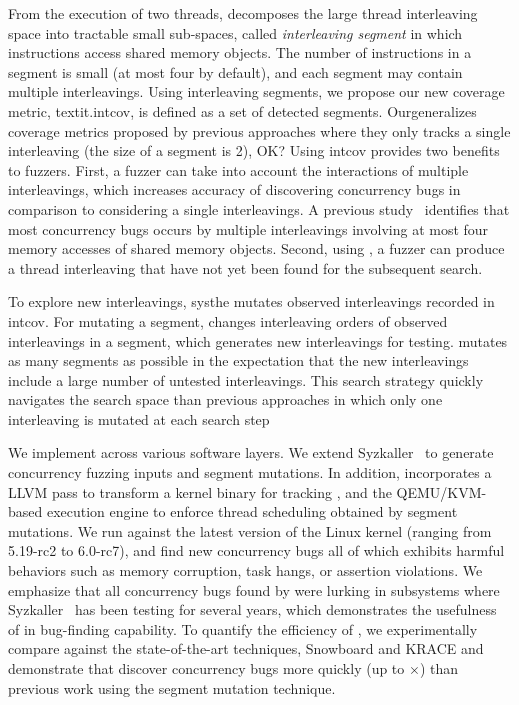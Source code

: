  From the execution of two threads,  
\sys decomposes the large thread interleaving space into tractable 
small sub-spaces, called \textit{interleaving segment} in which
instructions access shared memory objects. The number of instructions 
in a segment is small (at most four by default), and each segment may 
contain multiple interleavings. Using interleaving segments, we propose 
our new coverage metric, textit.intcov, is defined as a set of detected segments. Our\Intcov generalizes coverage 
metrics proposed by previous approaches where they only tracks 
a single interleaving (the size of a segment is 2), OK? 
Using intcov provides two benefits to fuzzers. First, a fuzzer can 
take into account the interactions of multiple interleavings, which increases
accuracy of discovering concurrency bugs in comparison to considering a single 
interleavings. A previous study~\cite{learningfrommistakes} identifies that
most concurrency bugs occurs by multiple interleavings involving 
at most four memory accesses of shared memory objects.
Second, using \intcov, a fuzzer can produce a thread interleaving
that have not yet been found for the subsequent search.

%
To explore new interleavings,
sys\sysmutates the mutates observed interleavings recorded in intcov. For mutating a segment, \sys changes interleaving orders of observed interleavings 
in a segment, which generates new interleavings for testing. \sys 
mutates as many segments as possible in the expectation that the 
new interleavings include a large number of untested interleavings. 
This search strategy quickly navigates the search space than previous 
approaches in which only one interleaving is mutated at each search step

We implement \sys across various software layers.
We extend Syzkaller~\cite{syzkaller} to generate concurrency fuzzing inputs 
and segment mutations. 
%
In addition, \sys incorporates a LLVM pass to transform a kernel
binary for tracking \intcov, and the QEMU/KVM-based execution engine
to enforce thread scheduling obtained by segment mutations. 
%
We run \sys against the latest version of the Linux kernel (ranging
from 5.19-rc2 to 6.0-rc7), and find new \totalbugs concurrency bugs all of
which exhibits harmful behaviors such as memory corruption,
task hangs, or assertion violations. We emphasize that all
concurrency bugs found by \sys were lurking in subsystems where
Syzkaller~\cite{syzkaller} has been testing for several years, which
demonstrates the usefulness of \sys in bug-finding capability.
%
To quantify the efficiency of \sys, we experimentally compare \sys 
against the state-of-the-art techniques, Snowboard and KRACE and 
demonstrate that \sys discover concurrency bugs more quickly 
(up to $\times$) than previous work using the segment mutation 
technique.

